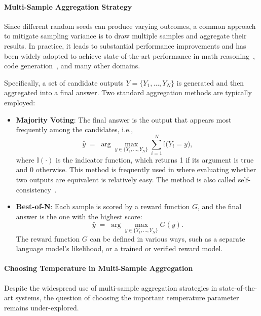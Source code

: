 \paragraph{Multi-Sample Aggregation Strategy} Since different random seeds can produce varying outcomes, a common approach to mitigate sampling variance is to draw multiple samples and aggregate their results. In practice, it leads to substantial performance improvements and has been widely adopted to achieve state-of-the-art performance in math reasoning~\cite{sun2024easy, jaech2024openai}, code generation~\cite{wang2024planning}, and many other domains.

Specifically, a set of candidate outputs \(Y = \{Y_1, \dots, Y_N\}\) is generated and then aggregated into a final answer. Two standard aggregation methods are typically employed:
\begin{itemize}
    \item \textbf{Majority Voting}: The final answer is the output that appears most frequently among the candidates, i.e.,
\[
\hat{y} \;=\; \arg\max_{y \in \{Y_1, \dots, Y_N\}} \sum_{i=1}^{N} \mathbb{I}\bigl(Y_i = y\bigr),
\]
where \(\mathbb{I}(\cdot)\) is the indicator function, which returns 1 if its argument is true and 0 otherwise. This method is frequently used in where evaluating whether two outputs are equivalent is relatively easy. The method is also called self-consistency~\cite{wang2022self}.
    \item \textbf{Best-of-N}: Each sample is scored by a reward function \(G\), and the final answer is the one with the highest score:
\[
\hat{y} \;=\; \arg\max_{y \in \{Y_1, \dots, Y_N\}} G(y).
\]
The reward function \(G\) can be defined in various ways, such as a separate language model’s likelihood, or a trained or verified reward model.
\end{itemize}


\paragraph{Choosing Temperature in Multi-Sample Aggregation} 
Despite the widespread use of multi-sample aggregation strategies in state-of-the-art systems, the question of choosing the important temperature parameter remains under-explored. 

